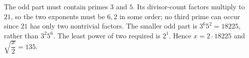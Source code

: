 The odd part must contain primes $3$ and $5$. Its divisor-count factors multiply to $21$, so the two exponents must be $6,2$ in some order; no third prime can occur since $21$ has only two nontrivial factors. The smaller odd part is $3^6 5^2=18225$, rather than $3^2 5^6$. The least power of two required is $2^1$. Hence $x=2\cdot18225$ and $\boxed{\sqrt{\dfrac{x}{2}}=135}$.
